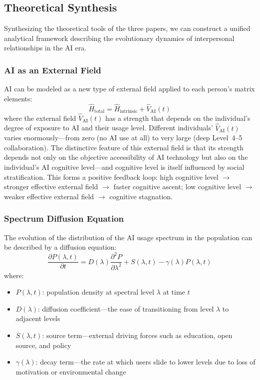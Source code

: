 ﻿\documentclass[12pt,a4paper]{article}
\begin{document}
\subsection{Theoretical Synthesis}

Synthesizing the theoretical tools of the three papers, we can construct a unified analytical framework describing the evolutionary dynamics of interpersonal relationships in the AI era.

\subsubsection{AI as an External Field}

AI can be modeled as a new type of external field applied to each person's matrix elements:
\begin{equation}
\hat{H}_{\text{total}} = \hat{H}_{\text{intrinsic}} + \hat{V}_{\text{AI}}(t)
\end{equation}
where the external field $\hat{V}_{\text{AI}}(t)$ has a strength that depends on the individual's degree of exposure to AI and their usage level. Different individuals' $\hat{V}_{\text{AI}}(t)$ varies enormously---from zero (no AI use at all) to very large (deep Level~4--5 collaboration). The distinctive feature of this external field is that its strength depends not only on the objective accessibility of AI technology but also on the individual's AI cognitive level---and cognitive level is itself influenced by social stratification. This forms a positive feedback loop: high cognitive level ${}\to{}$ stronger effective external field ${}\to{}$ faster cognitive ascent; low cognitive level ${}\to{}$ weaker effective external field ${}\to{}$ cognitive stagnation.

\subsubsection{Spectrum Diffusion Equation}

The evolution of the distribution of the AI usage spectrum in the population can be described by a diffusion equation:
\begin{equation}
\frac{\partial P(\lambda, t)}{\partial t} = D(\lambda) \frac{\partial^2 P}{\partial \lambda^2} + S(\lambda, t) - \gamma(\lambda) P(\lambda, t)
\end{equation}
where:
\begin{itemize}
\item $P(\lambda, t)$: population density at spectral level $\lambda$ at time $t$
\item $D(\lambda)$: diffusion coefficient---the ease of transitioning from level $\lambda$ to adjacent levels
\item $S(\lambda, t)$: source term---external driving forces such as education, open source, and policy
\item $\gamma(\lambda)$: decay term---the rate at which users slide to lower levels due to loss of motivation or environmental change
\end{itemize}
\end{document}
